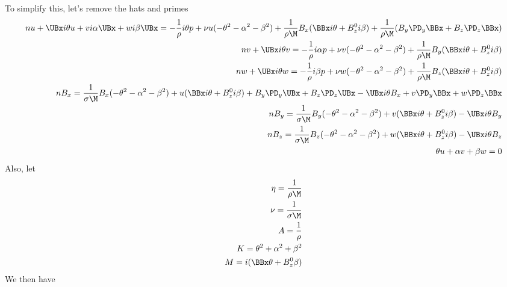 \documentclass[11pt]{article}
\begin{document}
To simplify this, let's remove the hats and primes
\begin{equation}\begin{aligned}
n u+ \UBx i\theta u + v i \alpha \UBx + w i \beta \UBx = -\frac{1}{\rho} i \theta p+ \nu u (-\theta^2 -\alpha^2 - \beta^2) + \frac{1}{\rho \M} B_x (\BBx i\theta + B_z^0 i\beta) + \frac{1}{\rho \M} (B_y \PD_y \BBx + B_z \PD_z \BBx) \\
n v+ \UBx i\theta v                                    = -\frac{1}{\rho} i \alpha p+ \nu v (-\theta^2 -\alpha^2 - \beta^2) + \frac{1}{\rho \M} B_y (\BBx i\theta + B_z^0 i\beta) \\
n w+ \UBx i\theta w                                    = -\frac{1}{\rho} i \beta  p+ \nu w (-\theta^2 -\alpha^2 - \beta^2) + \frac{1}{\rho \M} B_z (\BBx i\theta + B_z^0 i\beta) \\
n B_x = \frac{1}{\sigma \M} B_x (-\theta^2 -\alpha^2 -\beta^2) + u (\BBx i\theta +B_z^0 i\beta) +B_y \PD_y \UBx +B_z \PD_z \UBx - \UBx i\theta B_x + v \PD_y \BBx +w \PD_z \BBx \\
n B_y = \frac{1}{\sigma \M} B_y (-\theta^2 -\alpha^2 -\beta^2) + v (\BBx i\theta +B_z^0 i\beta)                                 - \UBx i\theta B_y                                         \\
n B_z = \frac{1}{\sigma \M} B_z (-\theta^2 -\alpha^2 -\beta^2) + w (\BBx i\theta +B_z^0 i\beta)                                 - \UBx i\theta B_z                                         \\
\theta u +  \alpha v +  \beta w = 0 \\
\end{aligned} \end{equation}
Also, let
\begin{equation}\begin{aligned}
\eta=\frac{1}{\rho \M} \\
\nu=\frac{1}{\sigma \M} \\
A = \frac{1}{\rho} \\
K=\theta^2 +\alpha^2 + \beta^2 \\
M=i(\BBx \theta + B_z^0 \beta) \\
\end{aligned} \end{equation}
We then have
\end{document}
